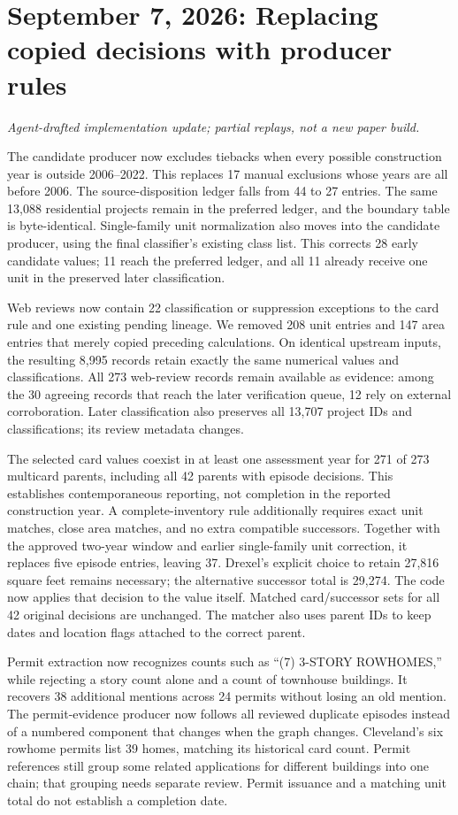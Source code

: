 \section*{September 7, 2026: Replacing copied decisions with producer rules}
\textit{Agent-drafted implementation update; partial replays, not a new paper build.}

The candidate producer now excludes tiebacks when every possible construction
year is outside 2006--2022. This replaces 17 manual exclusions whose years
are all before 2006. The source-disposition ledger falls from 44 to 27 entries.
The same 13,088 residential projects remain in the preferred ledger, and the
boundary table is byte-identical. Single-family unit normalization also moves
into the candidate producer, using the final classifier's existing class list.
This corrects 28 early candidate values; 11 reach the preferred ledger, and
all 11 already receive one unit in the preserved later classification.

Web reviews now contain 22 classification or suppression exceptions to the
card rule and one existing pending lineage. We removed 208 unit
entries and 147 area entries that merely copied preceding calculations.
On identical upstream inputs, the resulting 8,995 records retain exactly the
same numerical values and classifications. All 273 web-review records remain
available as evidence: among the 30 agreeing records that reach the later
verification queue, 12 rely on external corroboration. Later classification also preserves all 13,707 project IDs
and classifications; its review metadata changes.

The selected card values coexist in at least one assessment year for 271 of
273 multicard parents, including all 42 parents with episode decisions.
This establishes contemporaneous reporting, not completion in the reported
construction year. A complete-inventory rule additionally requires exact
unit matches, close area matches, and no extra compatible successors.
Together with the approved two-year window and earlier single-family unit
correction, it replaces five episode entries, leaving 37. Drexel's explicit
choice to retain 27,816 square feet remains necessary; the alternative
successor total is 29,274. The code now applies that decision to the value
itself. Matched card/successor sets for all 42 original decisions are unchanged.
The matcher also uses parent IDs to keep dates and location flags attached
to the correct parent.

Permit extraction now recognizes counts such as ``(7) 3-STORY ROWHOMES,''
while rejecting a story count alone and a count of townhouse buildings.
It recovers 38 additional mentions across 24 permits without losing an old
mention. The permit-evidence producer now follows all reviewed duplicate
episodes instead of a numbered component that changes when the graph changes.
Cleveland's six rowhome permits list 39 homes, matching its historical card
count. Permit references still group some related applications for different
buildings into one chain; that grouping needs separate review. Permit issuance
and a matching unit total do not establish a completion date.

